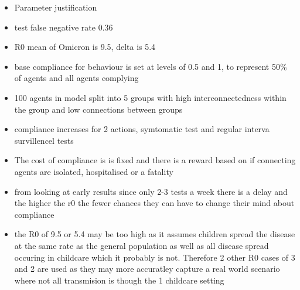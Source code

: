 \documentclass{article}
\begin{document}
\begin{itemize}

\item Parameter justification
\item test false negative rate 0.36 ~\cite{van_de_mortel_2022}
\item R0 mean of Omicron is 9.5, delta is 5.4 ~\cite{liu_rocklov_2022}
\item base compliance for behaviour is set at levels of  0.5 and 1, to represent 50\% of agents and all agents complying
\item 100 agents in model split into 5 groups with high interconnectedness within the group and low connections between groups

\item compliance increases for 2 actions,  symtomatic test and regular interva survillencel tests
\item The cost of compliance is is fixed and there is a reward based on if connecting agents are isolated, hospitalised or a fatality

\item from looking at early results since only 2-3 tests a week there is a delay and the higher the r0 the fewer chances they can have to change their mind about compliance 

\item the R0 of 9.5 or 5.4 may be too high as it assumes children spread the disease at the same rate as the general population as well as all disease spread occuring in childcare which it probably is not. Therefore 2 other R0 cases of 3 and 2 are used as they may more accuratley capture a real world scenario where not all transmision is though the 1 childcare setting
\end{itemize}
\end{document}
